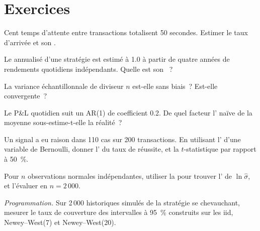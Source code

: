 \section{Exercices}

\begin{exercise}[$\star$]\label{exo:qm:estimation:1}
Cent temps d'attente entre transactions totalisent 50 secondes. Estimer le taux d'arrivée et son .
\end{exercise}

\begin{exercise}[$\star$]\label{exo:qm:estimation:2}
Le  annualisé d'une stratégie est estimé à 1.0 à partir de quatre années de rendements quotidiens indépendants. Quelle est son ~?
\end{exercise}

\begin{exercise}[$\star$]\label{exo:qm:estimation:3}
La variance échantillonnale de diviseur $n$ est-elle sans biais~? Est-elle convergente~?
\end{exercise}

\begin{exercise}[$\star\star$]\label{exo:qm:estimation:4}
Le P\&L quotidien suit un AR(1) de coefficient 0.2. De quel facteur l' naïve de la moyenne sous-estime-t-elle la
réalité~?
\end{exercise}

\begin{exercise}[$\star\star$]\label{exo:qm:estimation:5}
Un signal a eu raison dans 110 cas sur 200 transactions. En utilisant l' d'une variable de Bernoulli, donner l' du taux de
réussite, et la $t$-statistique par rapport à 50~\%.
\end{exercise}

\begin{exercise}[$\star\star$]\label{exo:qm:estimation:6}
Pour $n$ observations normales indépendantes, utiliser la  pour trouver l' de $\ln\hat\sigma$, et l'évaluer en $n = 2\,000$.
\end{exercise}

\begin{exercise}[$\star\star\star$]\label{exo:qm:estimation:7}
\emph{Programmation.} Sur 2\,000 historiques simulés de la stratégie se chevauchant, mesurer le taux de couverture des intervalles à 95~\% construits sur les
 iid, Newey--West(7) et Newey--West(20).
\end{exercise}

